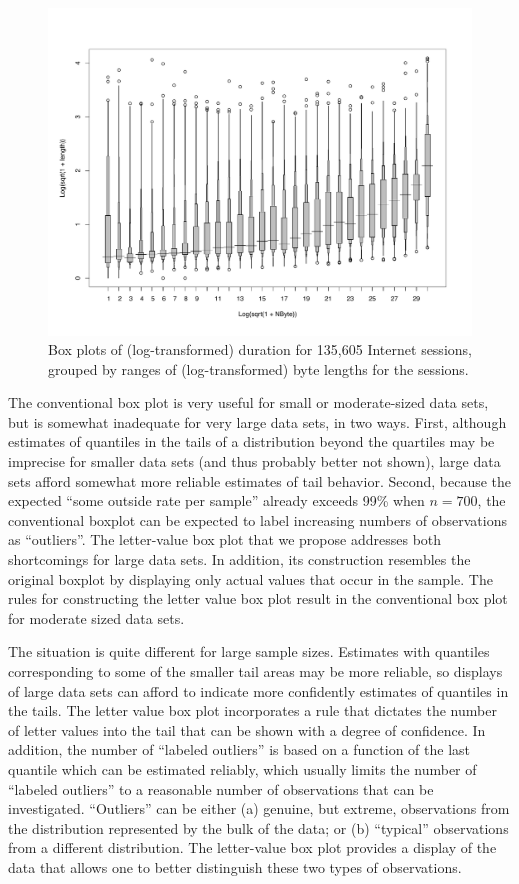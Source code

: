 \documentclass[oneside]{article}
\begin{document}
\begin{figure}[hbtp]
  \centering
  \includegraphics[width=0.75 \linewidth]{lvbox2}

  \caption{Box plots of (log-transformed) duration for
  135,605 Internet sessions, grouped by ranges of (log-transformed) byte
  lengths for the sessions.}
  \label{kkewbox} 
\end{figure}

The conventional box plot is very useful for small or moderate-sized data
sets, but is somewhat inadequate for very large data sets, in two ways. First,
although estimates of quantiles in the tails of a distribution beyond the
quartiles may be imprecise for smaller data sets (and thus probably better not
shown), large data sets afford somewhat more reliable estimates of tail
behavior. Second, because the expected ``some outside rate per sample''
already exceeds 99\% when $n = 700$, the conventional boxplot can be expected
to label increasing numbers of observations as ``outliers''. The letter-value
box plot that we propose addresses both shortcomings for large data sets. In
addition, its construction resembles the original boxplot by displaying only
actual values that occur in the sample. The rules for constructing the letter
value box plot result in the conventional box plot for moderate sized data
sets.

The situation is quite different for large sample sizes. Estimates with
quantiles corresponding to some of the smaller tail areas may be more
reliable, so displays of large data sets can afford to indicate more
confidently estimates of quantiles in the tails. The letter value box plot
incorporates a rule that dictates the number of letter values into the tail
that can be shown with a degree of confidence. In addition, the number of
``labeled outliers'' is based on a function of the last quantile which can be
estimated reliably, which usually limits the number of ``labeled outliers'' to
a reasonable number of observations that can be investigated. ``Outliers'' can
be either (a) genuine, but extreme, observations from the distribution
represented by the bulk of the data; or (b) ``typical'' observations from a
different distribution. The letter-value box plot provides a display of the
data that allows one to better distinguish these two types of observations.
\end{document}
